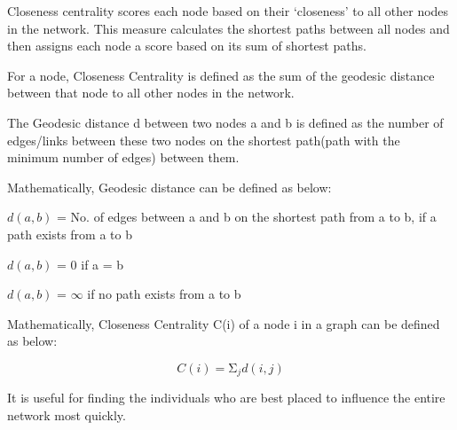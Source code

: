 \documentclass[12pt, a4paper]{article}
\begin{document}
    \begin{flushleft}
    Closeness centrality scores each node based on their ‘closeness’ to all other nodes in the network. This measure calculates the shortest paths between all nodes and then assigns each node a score based on its sum of shortest paths.

    For a node, Closeness Centrality is defined as the sum of the geodesic distance between that node to all other nodes in the network.
    
    The Geodesic distance d between two nodes a and b is defined as the number of edges/links between these two nodes on the shortest path(path with the minimum number of edges) between them.
    
    Mathematically, Geodesic distance can be defined as below:
    
    $d(a, b)$ = No. of edges between a and b on the shortest path from a to b, if a path exists from a to b
    
    $d(a, b)$ = 0 if a = b
    
    $d(a, b)$ = $\infty$ if no path exists from a to b

    Mathematically, Closeness Centrality C(i) of a node i in a graph can be defined as below:

    $$C\left(i\right)=\mathrm{\Sigma}_jd\left(i,j\right) $$

    It is useful for finding the individuals who are best placed to influence the entire network most quickly.
    
    \end{flushleft}
\end{document}
